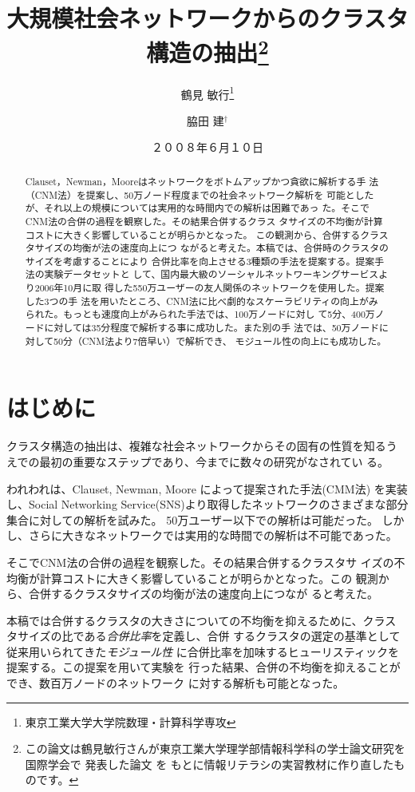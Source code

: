 \documentclass [a4j,11pt] {jsarticle}
\title  {大規模社会ネットワークからのクラスタ構造の抽出\thanks {
  この論文は鶴見敏行さんが東京工業大学理学部情報科学科の学士論文研究を国際学会で
  発表した論文 \protect\cite {wakita-2007-finding-community-structure-in-mega-scale-social}を
  もとに情報リテラシの実習教材に作り直したものです。}}
\author {鶴見 敏行\thanks {東京工業大学大学院数理・計算科学専攻} \and 脇田 建{$^\dagger$}}
\date {２００８年６月１０日}
\begin{document}
\maketitle


\begin {abstract}
Clauset，Newman，Mooreはネットワークをボトムアップかつ貪欲に解析する手
法（CNM法）を提案し、50万ノード程度までの社会ネットワーク解析を
可能としたが、それ以上の規模については実用的な時間内での解析は困難であっ
た。そこでCNM法の合併の過程を観察した。その結果合併するクラス
タサイズの不均衡が計算コストに大きく影響していることが明らかとなった。
この観測から、合併するクラスタサイズの均衡が法の速度向上につ
ながると考えた。本稿では、合併時のクラスタのサイズを考慮することにより
合併比率を向上させる3種類の手法を提案する。提案手法の実験データセットと
して、国内最大級のソーシャルネットワーキングサービスより2006年10月に取
得した550万ユーザーの友人関係のネットワークを使用した。提案した3つの手
法を用いたところ、CNM法に比べ劇的なスケーラビリティの向上がみ
られた。もっとも速度向上がみられた手法では、100万ノードに対し
て5分、400万ノードに対しては35分程度で解析する事に成功した。また別の手
法では、50万ノードに対して50分（CNM法より7倍早い）で解析でき、
モジュール性の向上にも成功した。
\end {abstract}

\section {はじめに}
\label {sect: はじめに}

クラスタ構造の抽出は、複雑な社会ネットワークからその固有の性質を知るう
えでの最初の重要なステップであり、今までに数々の研究がなされてい
る。
\cite{Kleinberg99,
  Page99,
  Dean99,
  Kumar99,
  Miller01,
  Toyoda01,
  Wu04,
  Cai04,
  Clauset04,
  Onsjo06}


われわれは、Clauset, Newman, Moore によって提案された手法(CMM法)
\cite{Clauset04}
を実装し、Social Networking Service(SNS)より取得したネットワークのさまざまな部分集合に対しての解析を試みた。
50万ユーザー以下での解析は可能だった。
しかし、さらに大きなネットワークでは実用的な時間での解析は不可能であった。

そこでCNM法の合併の過程を観察した。その結果合併するクラスタサ
イズの不均衡が計算コストに大きく影響していることが明らかとなった。この
観測から、合併するクラスタサイズの均衡が法の速度向上につなが
ると考えた。

本稿では合併するクラスタの大きさについての不均衡を抑えるために、クラス
タサイズの比である\emph {合併比率}を定義し、合併
するクラスタの選定の基準として従来用いられてきた{\em モジュール性}
に合併比率を加味するヒューリスティックを提案する。この提案を用いて実験を
行った結果、合併の不均衡を抑えることができ、数百万ノードのネットワーク
に対する解析も可能となった。
\end{document}
